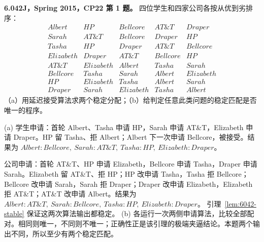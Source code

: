 \begin{exercise}\label{mit:6042-cp22-q1}
\textbf{6.042J，Spring 2015，CP22 第 1 题。}
四位学生和四家公司各按从优到劣排序：
\[
\begin{array}{c|llll}
Albert&HP&Bellcore&AT\&T&Draper\\
Sarah&AT\&T&Bellcore&Draper&HP\\
Tasha&HP&Draper&AT\&T&Bellcore\\
Elizabeth&Draper&AT\&T&Bellcore&HP\\\hline
AT\&T&Elizabeth&Albert&Tasha&Sarah\\
Bellcore&Tasha&Sarah&Albert&Elizabeth\\
HP&Elizabeth&Tasha&Albert&Sarah\\
Draper&Sarah&Elizabeth&Tasha&Albert
\end{array}
\]
（a）用延迟接受算法求两个稳定分配；（b）给判定任意此类问题的稳定匹配是否唯一的程序。
\end{exercise}
\begin{solution}
(a) 学生申请：首轮 Albert、Tasha 申请 HP，Sarah 申请 AT\&T，Elizabeth 申请 Draper。HP 留 Tasha、拒 Albert；Albert 下一次申请 Bellcore，被接受。结果为
$Albert\!:\!Bellcore,\ Sarah\!:\!AT\&T,\ Tasha\!:\!HP,\ Elizabeth\!:\!Draper$。

公司申请：首轮 AT\&T、HP 申请 Elizabeth，Bellcore 申请 Tasha，Draper 申请 Sarah。Elizabeth 留 AT\&T、拒 HP；HP 改申请 Tasha，Tasha 拒 Bellcore；Bellcore 改申请 Sarah，Sarah 拒 Draper；Draper 改申请 Elizabeth，Elizabeth 拒 AT\&T；AT\&T 改申请 Albert。结果为
$Albert\!:\!AT\&T,\ Sarah\!:\!Bellcore,\ Tasha\!:\!HP,\ Elizabeth\!:\!Draper$。
引理~\ref{lem:6042-stable} 保证这两次算法输出都稳定。
(b) 各运行一次两侧申请算法，比较全部配对。相同则唯一，不同则不唯一；正确性正是该引理的极端夹逼结论。本题两个输出不同，所以至少有两个稳定匹配。
\end{solution}

